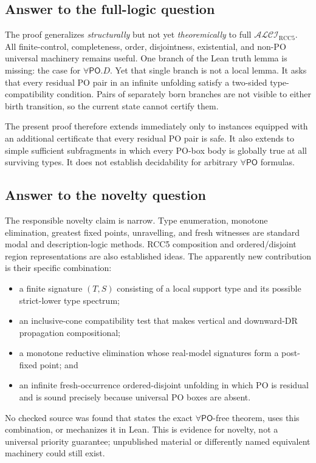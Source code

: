\documentclass[11pt]{article}
\newcommand{\PO}{\mathsf{PO}}
\begin{document}
\subsection{Answer to the full-logic question}

The proof generalizes \emph{structurally} but not yet \emph{theoremically} to full
$\mathcal{ALCI}_{\mathrm{RCC5}}$. All finite-control, completeness, order, disjointness,
existential, and non-PO universal machinery remains useful. One branch of the Lean
truth lemma is missing: the case for $\forall\PO.D$. Yet that single branch is not a
local lemma. It asks that every residual PO pair in an infinite unfolding satisfy a
two-sided type-compatibility condition. Pairs of separately born branches are not
visible to either birth transition, so the current state cannot certify them.

The present proof therefore extends immediately only to instances equipped with an
additional certificate that every residual PO pair is safe. It also extends to simple
sufficient subfragments in which every PO-box body is globally true at all surviving
types. It does not establish decidability for arbitrary $\forall\PO$ formulas.

\subsection{Answer to the novelty question}

The responsible novelty claim is narrow. Type enumeration, monotone elimination,
greatest fixed points, unravelling, and fresh witnesses are standard modal and
description-logic methods. RCC5 composition and ordered/disjoint region
representations are also established ideas. The apparently new contribution is their
specific combination:
\begin{itemize}
  \item a finite signature $(T,S)$ consisting of a local support type and its possible
  strict-lower type spectrum;
  \item an inclusive-cone compatibility test that makes vertical and downward-DR
  propagation compositional;
  \item a monotone reductive elimination whose real-model signatures form a
  post-fixed point; and
  \item an infinite fresh-occurrence ordered-disjoint unfolding in which PO is
  residual and is sound precisely because universal PO boxes are absent.
\end{itemize}
No checked source was found that states the exact $\forall\PO$-free theorem, uses this
combination, or mechanizes it in Lean. This is evidence for novelty, not a universal
priority guarantee; unpublished material or differently named equivalent machinery
could still exist.
\end{document}

